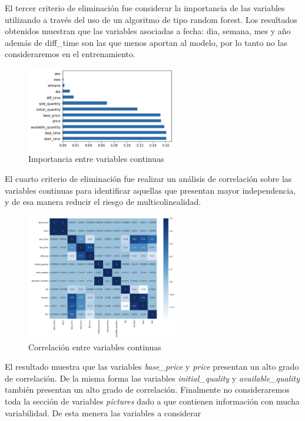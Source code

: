\documentclass[a4paper,10pt]{article}
\begin{document}
El tercer criterio de eliminación fue considerar la importancia de las variables utilizando a través del uso de un algoritmo de tipo random forest.
Los resultados obtenidos muestran que las variables asociadas a fecha: dia, semana, mes y año además de diff\_time son las que menos aportan al modelo, por lo tanto no las consideraremos en el entrenamiento.
\begin{figure}[htb]
\centering
\includegraphics[width=0.6\textwidth]{./pictures/importance.png}
\caption{Importancia entre variables continuas} \label{import}
\end{figure}  
\newline  
El cuarto criterio de eliminación fue realizar un análisis de correlación sobre las variables continuas para identificar aquellas que presentan mayor independencia,
y de esa manera reducir el riesgo de multicolinealidad.
\begin{figure}[htb]
\centering
\includegraphics[width=0.6\textwidth]{./pictures/corr.png}
\caption{Correlación entre variables continuas} \label{corr}
\end{figure}    
El resultado muestra que las variables \textit{base\_price} y \textit{price} presentan un alto grado de correlación. De la misma forma las variables \textit{initial\_quality}
y \textit{available\_quality} también presentan un alto grado de correlación.
\newline
Finalmente no consideraremos toda la sección de variables \textit{pictures} dado a que contienen información con mucha variabilidad. De esta menera las variables a considerar 
\end{document}
